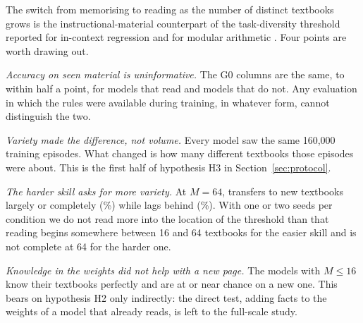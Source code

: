 The switch from memorising to reading as the number of distinct textbooks grows is the instructional-material counterpart of the task-diversity threshold reported for in-context regression \citep{raventos2023diversity} and for modular arithmetic \citep{he2024grok}.
Four points are worth drawing out.

\emph{Accuracy on seen material is uninformative.}
The G0 columns are the same, to within half a point, for models that read and models that do not.
Any evaluation in which the rules were available during training, in whatever form, cannot distinguish the two.

\emph{Variety made the difference, not volume.}
Every model saw the same 160{,}000 training episodes.
What changed is how many different textbooks those episodes were about.
This is the first half of hypothesis H3 in Section~\ref{sec:protocol}.

\emph{The harder skill asks for more variety.}
At $M=64$,  transfers to new textbooks largely or completely (\EOneMSixFourNewFollowList\%) while  lags behind (\EOneMSixFourNewComposeTwoList\%).
With one or two seeds per condition we do not read more into the location of the threshold than that reading begins somewhere between 16 and 64 textbooks for the easier skill and is not complete at 64 for the harder one.

\emph{Knowledge in the weights did not help with a new page.}
The models with $M \le 16$ know their textbooks perfectly and are at or near chance on a new one.
This bears on hypothesis H2 only indirectly: the direct test, adding facts to the weights of a model that already reads, is left to the full-scale study.
